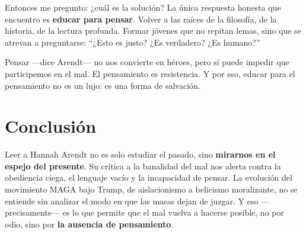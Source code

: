 \documentclass[12pt]{article}
\begin{document}
Entonces me pregunto: ¿cuál es la solución?  
La única respuesta honesta que encuentro es \textbf{educar para pensar}. Volver a las raíces de la filosofía, de la historia, de la lectura profunda. Formar jóvenes que no repitan lemas, sino que se atrevan a preguntarse: ``¿Esto es justo? ¿Es verdadero? ¿Es humano?''

Pensar ---dice Arendt--- no nos convierte en héroes, pero sí puede impedir que participemos en el mal. El pensamiento es resistencia. Y por eso, educar para el pensamiento no es un lujo: es una forma de salvación.

\section*{Conclusión}

Leer a Hannah Arendt no es solo estudiar el pasado, sino \textbf{mirarnos en el espejo del presente}. Su crítica a la banalidad del mal nos alerta contra la obediencia ciega, el lenguaje vacío y la incapacidad de pensar. La evolución del movimiento MAGA bajo Trump, de aislacionismo a belicismo moralizante, no se entiende sin analizar el modo en que las masas dejan de juzgar. Y eso ---precisamente--- es lo que permite que el mal vuelva a hacerse posible, no por odio, sino por \textbf{la ausencia de pensamiento}.
\end{document}
